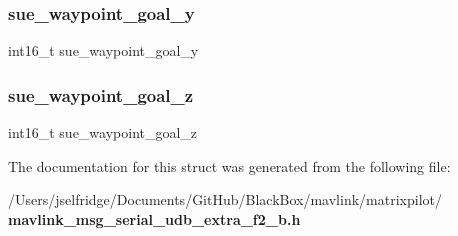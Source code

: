 \subsubsection{sue\+\_\+waypoint\+\_\+goal\+\_\+y}
{\footnotesize\ttfamily int16\+\_\+t sue\+\_\+waypoint\+\_\+goal\+\_\+y}

\mbox{\label{struct____mavlink__serial__udb__extra__f2__b__t_af076c1baba038c633b10ff9fdb25f73f}} 
\subsubsection{sue\+\_\+waypoint\+\_\+goal\+\_\+z}
{\footnotesize\ttfamily int16\+\_\+t sue\+\_\+waypoint\+\_\+goal\+\_\+z}



The documentation for this struct was generated from the following file\+:\begin{DoxyCompactItemize}
\item 
/\+Users/jselfridge/\+Documents/\+Git\+Hub/\+Black\+Box/mavlink/matrixpilot/\textbf{ mavlink\+\_\+msg\+\_\+serial\+\_\+udb\+\_\+extra\+\_\+f2\+\_\+b.\+h}\end{DoxyCompactItemize}
